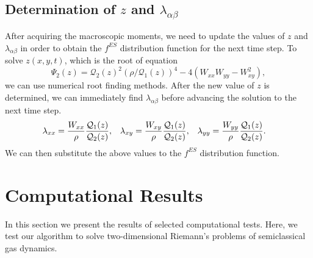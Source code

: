 \documentclass{rsproca}%
\begin{document}
\subsection{Determination of $z$ and $\lambda_{\alpha \beta}$}
After acquiring the macroscopic moments, we need to update the values of $z$ and $\lambda_{\alpha \beta}$ in order to obtain the $f^{ES}$ distribution function for the next time step.  To solve $z(x,y,t)$, which is the root of equation
\begin{equation}
	\Psi_2(z)=\mathcal{Q}_{2}(z)^2 (\rho/\mathcal{Q}_{1}(z))^{4} - 4 (W_{xx} W_{yy} - W_{xy}^2),
\end{equation}
we can use numerical root finding methods.  After the new value of $z$ is determined, we can immediately find $\lambda_{\alpha \beta}$ before advancing the solution to the next time step.
\begin{align}
&\lambda_{xx} = {W_{xx} \over \rho} {\mathcal{Q}_{1}(z) \over \mathcal{Q}_{2}(z)},&
&\lambda_{xy} = {W_{xy} \over \rho} {\mathcal{Q}_{1}(z) \over \mathcal{Q}_{2}(z)},&
&\lambda_{yy} = {W_{yy} \over \rho} {\mathcal{Q}_{1}(z) \over \mathcal{Q}_{2}(z)}.&
\end{align}
We can then substitute the above values to the $f^{ES}$ distribution function.

\section{Computational Results}
\label{results}

In this section we present the results of selected computational tests.  Here, we test our algorithm to solve two-dimensional Riemann's problems of semiclassical gas dynamics.
\end{document}
